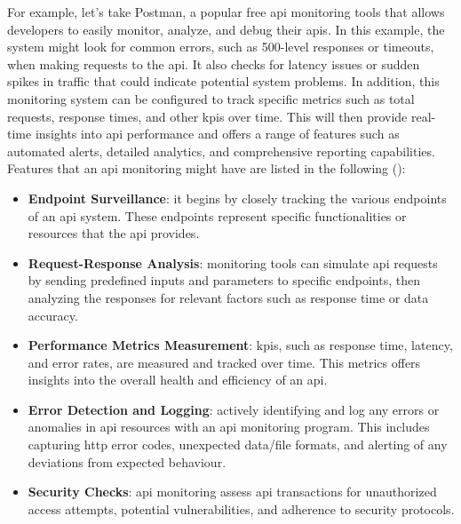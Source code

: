 \begin{multicols}{2}
      For example, let's take Postman, a popular free \acrshort{api} monitoring tools that allows developers to easily 
      monitor, analyze, and debug their \acrshort{api}s. In this example, the system might look for common errors, such 
      as 500-level responses or timeouts, when making requests to the \acrshort{api}. It also checks for latency issues 
      or sudden spikes in traffic that could indicate potential system problems. In addition, this monitoring system can 
      be configured to track specific metrics such as total requests, response times, and other \acrshort{kpi}s over time. 
      This will then provide real-time insights into \acrshort{api} performance and offers a range of features such as 
      automated alerts, detailed analytics, and comprehensive reporting capabilities. Features that an \acrshort{api} 
      monitoring might have are listed in the following (\cite{postmanapimonitoring}):
      \begin{itemize}
            \item \textbf{Endpoint Surveillance}: it begins by closely tracking the various endpoints of an \acrshort{api}
                  system. These endpoints represent specific functionalities or resources that the \acrshort{api} provides.
            \item \textbf{Request-Response Analysis}: monitoring tools can simulate \acrshort{api} requests by sending 
                  predefined inputs and parameters to specific endpoints, then analyzing the responses for relevant factors
                  such as response time or data accuracy.
            \item \textbf{Performance Metrics Measurement}: \acrshort{kpi}s, such as response time, latency, and error rates,
                  are measured and tracked over time. This metrics offers insights into the overall health and efficiency of
                  an \acrshort{api}.
            \item \textbf{Error Detection and Logging}: actively identifying and log any errors or anomalies in \acrshort{api}
                  resources with an \acrshort{api} monitoring program. This includes capturing \acrshort{http} error codes, 
                  unexpected data/file formats, and alerting of any deviations from expected behaviour.
            \item \textbf{Security Checks}: \acrshort{api} monitoring assess \acrshort{api} transactions for unauthorized 
                  access attempts, potential vulnerabilities, and adherence to security protocols. 

\end{itemize}
\end{multicols}
